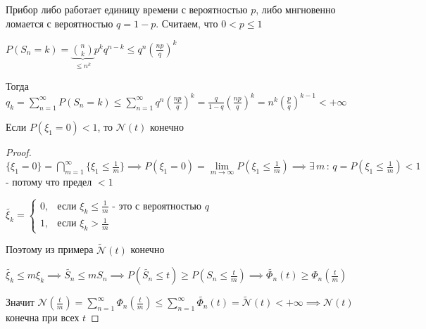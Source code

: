 \begin{example}
    Прибор либо работает единицу времени с вероятностью $p$, либо мнгновенно ломается с вероятностью $q = 1 - p$. Считаем, что $0 < p \leqslant 1$

    $P(S_n = k) = \underbrace{\binom{n}{k}}_{\leqslant n^k} p^k q^{n - k} \leqslant q^n \left( \frac{np}{q} \right)^k$

    Тогда $q_k = \sum\limits_{n = 1}^\infty P(S_n = k) \leqslant \sum\limits_{n=1}^\infty q^n \left( \frac{np}{q} \right)^k = \frac{q}{1 - q} \left( \frac{np}{q} \right)^k = n^k \left(\frac{p}{q}\right)^{k - 1} < +\infty$
\end{example}

\begin{theorem}
    Если $P(\xi_1 = 0) < 1$, то $\mathcal{N} (t)$ конечно
\end{theorem}

\begin{proof}
    $\{ \xi_1 = 0 \} = \bigcap\limits_{m=1}^\infty \{ \xi_1 \leqslant \frac{1}{m} \} \implies P(\xi_1 = 0) = \lim\limits_{m \to \infty} P(\xi_1 \leqslant \frac{1}{m}) \implies \exists \, m \, : \, q = P(\xi_1 \leqslant \frac{1}{m}) < 1$ - потому что предел $< 1$

    $\tilde{\xi_k} = 
    \begin{cases}
        0, & \text{если $\xi_k \leqslant \frac{1}{m}$ - это с вероятностью $q$} \\
        1, & \text{если $\xi_k > \frac{1}{m}$}    
    \end{cases}$

    Поэтому из примера $\tilde{\mathcal{N}} (t)$ конечно

    $\tilde{\xi_k} \leqslant m \xi_k \implies \tilde{S_n} \leqslant mS_n \implies P(\tilde{S_n} \leqslant t) \geqslant P(S_n \leqslant \frac{t}{m}) \implies \tilde{\Phi_n} (t) \geqslant \Phi_n \left(\frac{t}{m}\right) $

    Значит $\mathcal{N} \left( \frac{t}{m} \right) = \sum\limits_{n=1}^\infty \Phi_n \left( \frac{t}{m} \right) \leqslant \sum\limits_{n=1}^\infty \tilde{\Phi_n} (t) = \tilde{\mathcal{N}} (t) < +\infty \implies \mathcal{N} (t)$ конечна при всех $t$
\end{proof}


